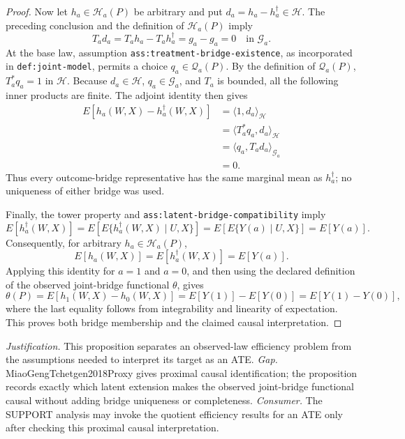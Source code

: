 \documentclass{article}
\begin{document}
\begin{proof}
Now let \(h_a\in\mathcal H_a(P)\) be arbitrary and put
\(d_a=h_a-h_a^\dagger\in\mathcal H\).  The preceding conclusion and the
definition of \(\mathcal H_a(P)\) imply
\[
T_a d_a=T_a h_a-T_a h_a^\dagger=g_a-g_a=0
\quad\text{in }\mathcal G_a.
\]
At the base law, assumption \texttt{ass:treatment-bridge-existence}, as
incorporated in \texttt{def:joint-model}, permits a choice
\(q_a\in\mathcal Q_a(P)\).  By the definition of \(\mathcal Q_a(P)\),
\(T_a^*q_a=1\) in \(\mathcal H\).  Because \(d_a\in\mathcal H\),
\(q_a\in\mathcal G_a\), and \(T_a\) is bounded, all the following inner
products are finite.  The adjoint identity then gives
\[
\begin{aligned}
E[h_a(W,X)-h_a^\dagger(W,X)]
&=\langle 1,d_a\rangle_{\mathcal H}\\
&=\langle T_a^*q_a,d_a\rangle_{\mathcal H}\\
&=\langle q_a,T_a d_a\rangle_{\mathcal G_a}\\
&=0.
\end{aligned}
\]
Thus every outcome-bridge representative has the same marginal mean as
\(h_a^\dagger\); no uniqueness of either bridge was used.

Finally, the tower property and
\texttt{ass:latent-bridge-compatibility} imply
\[
E[h_a^\dagger(W,X)]
=E\!\left[E\{h_a^\dagger(W,X)\mid U,X\}\right]
=E\!\left[E\{Y(a)\mid U,X\}\right]
=E[Y(a)].
\]
Consequently, for arbitrary \(h_a\in\mathcal H_a(P)\),
\[
E[h_a(W,X)]=E[h_a^\dagger(W,X)]=E[Y(a)].
\]
Applying this identity for \(a=1\) and \(a=0\), and then using the declared
definition of the observed joint-bridge functional \(\theta\), gives
\[
\theta(P)
=E[h_1(W,X)-h_0(W,X)]
=E[Y(1)]-E[Y(0)]
=E[Y(1)-Y(0)],
\]
where the last equality follows from integrability and linearity of
expectation.  This proves both bridge membership and the claimed causal
interpretation.
\end{proof}
\par\smallskip\noindent \textit{Justification.} This proposition separates an observed-law efficiency problem from the assumptions needed to interpret its target as an ATE. \textit{Gap.} MiaoGengTchetgen2018Proxy gives proximal causal identification; the proposition records exactly which latent extension makes the observed joint-bridge functional causal without adding bridge uniqueness or completeness. \textit{Consumer.} The SUPPORT analysis may invoke the quotient efficiency results for an ATE only after checking this proximal causal interpretation.
\end{document}
